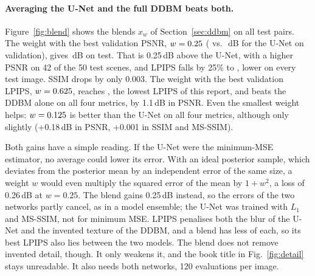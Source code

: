 \paragraph{Averaging the U-Net and the full DDBM beats both.} Figure~\ref{fig:blend} shows the blends $x_w$ of Section~\ref{sec:ddbm} on all test pairs. The weight with the best validation PSNR, $w=0.25$ (\BLENDVALPSNR{} vs.\ \BLENDVALUNET\,dB for the U-Net on validation), gives \BLENDQPSNR\,dB on test. That is 0.25\,dB above the U-Net, with a higher PSNR on 42 of the 50 test scenes, and LPIPS falls by 25\% to \BLENDQLPIPS{}, lower on every test image. SSIM drops by only 0.003. The weight with the best validation LPIPS, $w=0.625$, reaches \BLENDLLPIPS{}, the lowest LPIPS of this report, and beats the DDBM alone on all four metrics, by 1.1\,dB in PSNR. Even the smallest weight helps: $w=0.125$ is better than the U-Net on all four metrics, although only slightly (+0.18\,dB in PSNR, +0.001 in SSIM and MS-SSIM).

Both gains have a simple reading. If the U-Net were the minimum-MSE estimator, no average could lower its error. With an ideal posterior sample, which deviates from the posterior mean by an independent error of the same size, a weight $w$ would even multiply the squared error of the mean by $1+w^2$, a loss of 0.26\,dB at $w=0.25$. The blend gains 0.25\,dB instead, so the errors of the two networks partly cancel, as in a model ensemble; the U-Net was trained with $L_1$ and MS-SSIM, not for minimum MSE. LPIPS penalises both the blur of the U-Net and the invented texture of the DDBM, and a blend has less of each, so its best LPIPS also lies between the two models. The blend does not remove invented detail, though. It only weakens it, and the book title in Fig.~\ref{fig:detail} stays unreadable. It also needs both networks, 120 evaluations per image.

